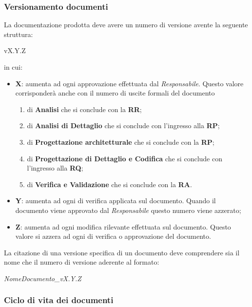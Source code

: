 \documentclass{scalatekids-article}
\begin{document}
\subsubsection{Versionamento documenti}

La documentazione prodotta deve avere un numero di versione avente la seguente struttura:\\
\begin{center}
    vX.Y.Z
\end{center}
in cui:
\begin{itemize}
    \item \textbf{X}: aumenta  ad ogni approvazione effettuata dal \textit{Responsabile}. Questo valore corrisponderà anche con il numero di uscite formali del documento
        \begin{enumerate}
            \item{} di \textbf{Analisi} che si conclude con la \textbf{RR};
            \item{} di \textbf{Analisi di Dettaglio} che si conclude con l'ingresso alla \textbf{RP};
            \item{} di \textbf{Progettazione architetturale} che si conclude con la \textbf{RP};
            \item{} di \textbf{Progettazione di Dettaglio e Codifica} che si conclude con l'ingresso alla \textbf{RQ};
            \item{} di \textbf{Verifica e Validazione} che si conclude con la \textbf{RA}.
        \end{enumerate}
    \item \textbf{Y}: aumenta ad ogni  di verifica applicata sul documento. Quando il documento viene approvato dal \textit{Responsabile} questo numero viene azzerato;
    \item \textbf{Z}: aumenta ad ogni modifica rilevante effettuata sul documento. Questo valore si azzera ad ogni  di verifica o approvazione del documento.
\end{itemize}
La citazione di una versione specifica di un documento deve comprendere sia il nome che il numero di versione aderente al formato:
\begin{center}
    \textit{NomeDocumento\_vX.Y.Z}
\end{center}

\subsubsection{Ciclo di vita dei documenti}
\end{document}
